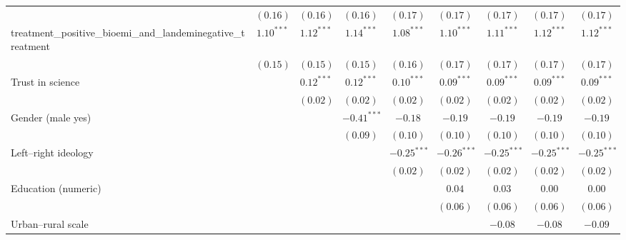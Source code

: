 \begin{table}[h]
\begin{center}
\begin{tabular}{l c c c c c c c c}
                                                             & $(0.16)$     & $(0.16)$      & $(0.16)$      & $(0.17)$      & $(0.17)$      & $(0.17)$      & $(0.17)$      & $(0.17)$      \\
treatment\_positive\_bioemi\_and\_landeminegative\_treatment & $1.10^{***}$ & $1.12^{***}$  & $1.14^{***}$  & $1.08^{***}$  & $1.10^{***}$  & $1.11^{***}$  & $1.12^{***}$  & $1.12^{***}$  \\
                                                             & $(0.15)$     & $(0.15)$      & $(0.15)$      & $(0.16)$      & $(0.17)$      & $(0.17)$      & $(0.17)$      & $(0.17)$      \\
Trust in science                                             &              & $0.12^{***}$  & $0.12^{***}$  & $0.10^{***}$  & $0.09^{***}$  & $0.09^{***}$  & $0.09^{***}$  & $0.09^{***}$  \\
                                                             &              & $(0.02)$      & $(0.02)$      & $(0.02)$      & $(0.02)$      & $(0.02)$      & $(0.02)$      & $(0.02)$      \\
Gender (male yes)                                            &              &               & $-0.41^{***}$ & $-0.18$       & $-0.19$       & $-0.19$       & $-0.19$       & $-0.19$       \\
                                                             &              &               & $(0.09)$      & $(0.10)$      & $(0.10)$      & $(0.10)$      & $(0.10)$      & $(0.10)$      \\
Left–right ideology                                          &              &               &               & $-0.25^{***}$ & $-0.26^{***}$ & $-0.25^{***}$ & $-0.25^{***}$ & $-0.25^{***}$ \\
                                                             &              &               &               & $(0.02)$      & $(0.02)$      & $(0.02)$      & $(0.02)$      & $(0.02)$      \\
Education (numeric)                                          &              &               &               &               & $0.04$        & $0.03$        & $0.00$        & $0.00$        \\
                                                             &              &               &               &               & $(0.06)$      & $(0.06)$      & $(0.06)$      & $(0.06)$      \\
Urban–rural scale                                            &              &               &               &               &               & $-0.08$       & $-0.08$       & $-0.09$       \\

\end{tabular}
\end{center}
\end{table}
